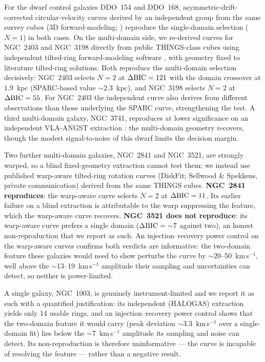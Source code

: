 \documentclass[twocolumn]{aastex701}
\newcommand{\dbic}{\Delta{\rm BIC}}
\begin{document}
For the dwarf control galaxies DDO~154 and DDO~168, asymmetric-drift-corrected
circular-velocity curves derived by an independent group from the same survey
cubes (3D forward-modeling; \citealt{Iorio2017}) reproduce the single-domain
selection ($N=1$) in both cases. On the multi-domain side, we re-derived curves
for NGC~2403 and NGC~3198 directly from public THINGS-class cubes using
independent tilted-ring forward-modeling software
\citep[\textsuperscript{3D}Barolo;][]{DiTeodoro2015}, with geometry fixed to
literature tilted-ring solutions. Both reproduce the multi-domain selection
decisively: NGC~2403 selects $N=2$ at $\dbic = 121$ with the domain crossover at
$1.9$~kpc (SPARC-based value $\sim 2.3$~kpc), and NGC~3198 selects $N=2$ at
$\dbic = 55$. For NGC~2403 the independent curve also derives from different
observations than those underlying the SPARC curve, strengthening the test. A
third multi-domain galaxy, NGC~3741, reproduces at lower significance on an
independent VLA-ANGST extraction \citep[different telescope from the
WSRT-based SPARC curve;][]{Walter2008}: the multi-domain geometry recovers,
though the modest signal-to-noise of this dwarf limits the decision margin.

Two further multi-domain galaxies, NGC~2841 and NGC~3521, are strongly warped,
so a blind fixed-geometry extraction cannot test them; we instead use published
warp-aware tilted-ring rotation curves (DiskFit; Sellwood \& Spekkens, private
communication) derived from the same THINGS cubes. \textbf{NGC~2841
reproduces}: the warp-aware curve selects $N=2$ at $\dbic = 11$. Its earlier
failure on a blind extraction is attributable to the warp suppressing the
feature, which the warp-aware curve recovers. \textbf{NGC~3521 does not
reproduce}: its warp-aware curve prefers a single domain ($\dbic = -7$ against
two), an honest non-reproduction that we report as such. An injection--recovery
power control on the warp-aware curves confirms both verdicts are informative:
the two-domain feature these galaxies would need to show perturbs the curve by
$\sim$20--50~km\,s$^{-1}$, well above the $\sim$13--19~km\,s$^{-1}$ amplitude
their sampling and uncertainties can detect, so neither is power-limited.

A single galaxy, NGC~1003, is genuinely instrument-limited and we report it as
such with a quantified justification: its independent (HALOGAS) extraction
yields only 14 usable rings, and an injection--recovery power control shows that
the two-domain feature it would carry (peak deviation $\sim$3.3~km\,s$^{-1}$
over a single-domain fit) lies below the $\sim$7~km\,s$^{-1}$ amplitude its
sampling and noise can detect. Its non-reproduction is therefore uninformative
--- the curve is incapable of resolving the feature --- rather than a negative
result.
\end{document}
